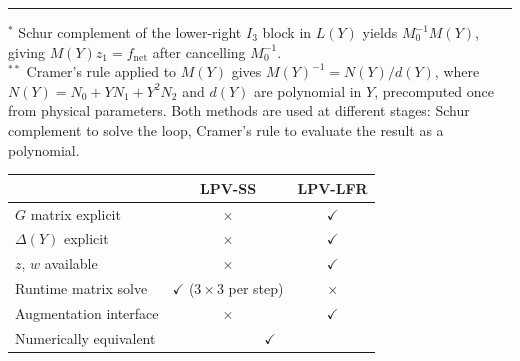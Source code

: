 \documentclass[11pt]{article}
\begin{document}
\medskip
\noindent\rule{\textwidth}{0.4pt}
\smallskip
\noindent
$^*$ Schur complement of the lower-right $I_3$ block in $L(Y)$ yields
$M_0^{-1}M(Y)$, giving $M(Y)z_1 = f_{\mathrm{net}}$ after cancelling $M_0^{-1}$.\\
$^{**}$ Cramer's rule applied to $M(Y)$ gives $M(Y)^{-1} = N(Y)/d(Y)$,
where $N(Y) = N_0 + YN_1 + Y^2N_2$ and $d(Y)$ are polynomial in $Y$,
precomputed once from physical parameters.
Both methods are used at different stages: Schur complement to solve the loop,
Cramer's rule to evaluate the result as a polynomial.

\bigskip

\begin{center}
\begin{tabular}{lcc}
\toprule
 & \textbf{LPV-SS} & \textbf{LPV-LFR} \\
\midrule
$G$ matrix explicit           & $\times$ & $\checkmark$ \\
$\Delta(Y)$ explicit          & $\times$ & $\checkmark$ \\
$z$, $w$ available            & $\times$ & $\checkmark$ \\
Runtime matrix solve          & $\checkmark$ ($3\times3$ per step) & $\times$ \\
Augmentation interface        & $\times$ & $\checkmark$ \\
Numerically equivalent        & \multicolumn{2}{c}{$\checkmark$} \\
\bottomrule
\end{tabular}
\end{center}
\end{document}
